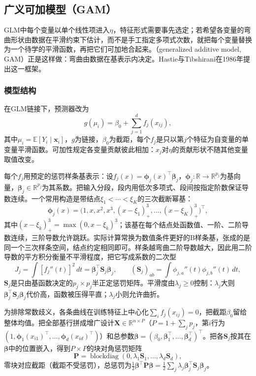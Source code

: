 \subsection{广义可加模型（GAM）}
\label{sec:regression-gam}

GLM中每个变量以单个线性项进入$\eta$，特征形式需要事先选定；若希望各变量的弯曲形状由数据在平滑约束下估计，而不是手工指定多项式次数，就把每个变量替换为一个待学的平滑函数，再把它们可加地合起来。（generalized additive model, GAM）正是这样做：弯曲由数据在基表示内决定。Hastie与Tibshirani在1986年提出这一框架。

\subsubsection{模型结构}
\label{sec:regression-gam-structure}

在GLM链接下，预测器改为
\begin{equation}
  g(\mu_i)=\beta_0+\sum_{j=1}^d f_j(x_{ij}),
  \label{eq:regression-gam}
\end{equation}
其中$\mu_i=\mathbb E[Y_i\mid\bm{x}_i]$，$g$为链接，$\beta_0$为截距，每个$f_j$是只以第$j$个特征为自变量的单变量平滑函数。可加性规定各变量贡献彼此相加：$x_j$对$\eta$的贡献形状不随其他变量取值改变。

每个$f_j$用预定的惩罚样条基表示：设$f_j(x)=\bm{\phi}_j(x)^{\top}\bm{\beta}_j$，$\bm{\phi}_j:\mathbb R\to\mathbb R^{p_j}$为基向量，$\bm{\beta}_j\in\mathbb R^{p_j}$为其系数。把输入分段，段内用低次多项式、段间按指定阶数保证导数连续。一个常用构造是带结点$\xi_1<\cdots<\xi_K$的三次截断幂基：
\[
  \bm{\phi}_j(x)=\bigl(1,x,x^2,x^3,(x-\xi_1)_+^3,\ldots,(x-\xi_K)_+^3\bigr)^{\top},
\]
其中$(x-\xi_k)_+^3=\max(0,x-\xi_k)^3$；该基在每个结点处函数值、一阶、二阶导数连续，三阶导数允许跳跃。实际计算常换为数值条件更好的B样条基，张成的是同一个三次样条空间，结点约定相同即可。样条越弯曲二阶导数越大，因此用二阶导数的平方积分衡量不平滑程度，把它写成系数的二次型
\[
  J_j=\int [f_j''(t)]^2\,dt=\bm{\beta}_j^{\top}\bm{S}_j\bm{\beta}_j,
\qquad
  (\bm{S}_j)_{ab}=\int \phi_{j,a}''(t)\phi_{j,b}''(t)\,dt,
\]
$\bm{S}_j$是只由基函数决定的$p_j\times p_j$半正定惩罚矩阵。平滑度由$\lambda_j\ge0$控制：$\lambda_j$大则$\bm{\beta}_j^{\top}\bm{S}_j\bm{\beta}_j$代价高，函数被压得平直；$\lambda_j$小则允许曲折。

为排除常数歧义，各条曲线在训练特征上中心化$\sum_i f_j(x_{ij})=0$，把截距$\beta_0$留给整体均值。把全部基行拼成增广设计$\bm{X}\in\mathbb R^{n\times P}$（$P=1+\sum_j p_j$，第$i$行为$(1,\bm{\phi}_1(x_{i1})^{\top},\ldots,\bm{\phi}_d(x_{id})^{\top})$）和总参数$\bm{\beta}=(\beta_0,\bm{\beta}_1^{\top},\ldots,\bm{\beta}_d^{\top})^{\top}$。把各$\bm{S}_j$按其在$\bm{\beta}$中的位置嵌入，得到$P\times P$的块对角惩罚矩阵
\[
  \bm{P}=\operatorname{blockdiag}(0,\lambda_1\bm{S}_1,\ldots,\lambda_d\bm{S}_d),
\]
零块对应截距（截距不受惩罚），总惩罚为$\frac12\bm{\beta}^{\top}\bm{P}\bm{\beta}=\frac12\sum_j\lambda_j\bm{\beta}_j^{\top}\bm{S}_j\bm{\beta}_j$。

